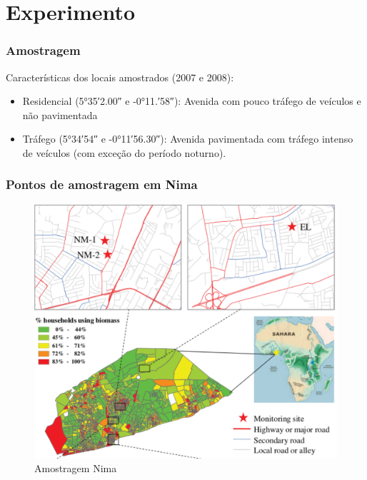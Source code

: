 \section{Experimento}

\begin{frame}
  \frametitle{Amostragem}
  Características dos locais amostrados (2007 e 2008):
  \begin{itemize}
	  \item Residencial (\ang{+5;35;2.00} e \ang{-0;11.;58}):
	  Avenida com pouco tráfego de veículos e não pavimentada
  \item Tráfego (\ang{+5;34;54} e \ang{-0;11;56.30}):
	  Avenida pavimentada com tráfego intenso de veículos (com exceção do período noturno).
  \end{itemize}
\end{frame}

\begin{frame}
  \frametitle{Pontos de amostragem em Nima}
  \begin{figure}[H]
    \centering
    \caption{Amostragem Nima}
    \includegraphics[scale=0.35]{../../../inputs/images/zheng/nima_mapa.pdf}
  \end{figure}
\end{frame}

